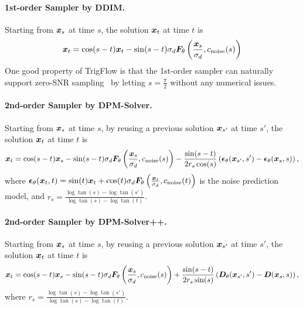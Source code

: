 \paragraph{1st-order Sampler by DDIM.} Starting from ${\bm{x}}_s$ at time $s$, the solution ${\bm{x}}_{t}$ at time $t$ is
\begin{equation}
    {\bm{x}}_{t} = \cos(s - t){\bm{x}}_t - \sin(s - t)\sigma_d {\bm{F}}_\theta\left(\frac{{\bm{x}}_s}{\sigma_d}, c_{\text{noise}}(s)\right)
\end{equation}
One good property of TrigFlow is that the 1st-order sampler can naturally support zero-SNR sampling~\citep{lin2024common} by letting $s = \frac{\pi}{2}$ without any numerical issues.


\paragraph{2nd-order Sampler by DPM-Solver.} Starting from ${\bm{x}}_s$ at time $s$, by reusing a previous solution ${\bm{x}}_{s'}$ at time $s'$, the solution ${\bm{x}}_{t}$ at time $t$ is
\begin{equation}
    {\bm{x}}_{t} = \cos(s - t){\bm{x}}_s - \sin(s - t)\sigma_d {\bm{F}}_\theta\left(\frac{{\bm{x}}_s}{\sigma_d}, c_{\text{noise}}(s)\right)
                - \frac{\sin(s - t)}{2 r_s \cos(s)}\left( \bm{\epsilon}_\theta({\bm{x}}_{s'}, s') - \bm{\epsilon}_\theta({\bm{x}}_s,s) \right),
\end{equation}
where $\bm{\epsilon}_\theta({\bm{x}}_t,t)=\sin(t){\bm{x}}_t + \cos(t) \sigma_d {\bm{F}}_\theta\left(\frac{{\bm{x}}_t}{\sigma_d}, c_{\text{noise}}(t)\right)$ is the noise prediction model, and $r_s = \frac{\log\tan(s) - \log\tan(s')}{\log\tan(s) - \log\tan(t)}$.

\paragraph{2nd-order Sampler by DPM-Solver++.} Starting from ${\bm{x}}_s$ at time $s$, by reusing a previous solution ${\bm{x}}_{s'}$ at time $s'$, the solution ${\bm{x}}_{t}$ at time $t$ is
\begin{equation}
    {\bm{x}}_{t} = \cos(s - t){\bm{x}}_s - \sin(s - t)\sigma_d {\bm{F}}_\theta\left(\frac{{\bm{x}}_s}{\sigma_d}, c_{\text{noise}}(s)\right)
                + \frac{\sin(s - t)}{2 r_s \sin(s)}\left( {\bm{D}}_\theta({\bm{x}}_{s'}, s') - {\bm{D}}({\bm{x}}_s,s) \right),
\end{equation}
where $r_s = \frac{\log\tan(s) - \log\tan(s')}{\log\tan(s) - \log\tan(t)}$.


